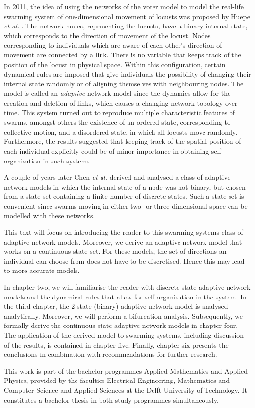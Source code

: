 In 2011, the idea of using the networks of the voter model to model the real-life swarming system of one-dimensional movement of locusts \cite{Buhl2006} was proposed by Huepe \textit{et al.} \cite{Huepe2011}. The network nodes, representing the locusts, have a binary internal state, which corresponds to the direction of movement of the locust. Nodes corresponding to individuals which are aware of each other's direction of movement are connected by a link. There is no variable that keeps track of the position of the locust in physical space. Within this configuration, certain dynamical rules are imposed that give individuals the possibility of changing their internal state randomly or of aligning themselves with neighbouring nodes. The model is called an \textit{adaptive} network model since the dynamics allow for the creation and deletion of links, which causes a changing network topology over time. This system turned out to reproduce multiple characteristic features of swarms, amongst others the existence of an ordered state, corresponding to collective motion, and a disordered state, in which all locusts move randomly. Furthermore, the results suggested that keeping track of the spatial position of each individual explicitly could be of minor importance in obtaining self-organisation in such systems.

A couple of years later Chen \textit{et al.} \cite{Chen2016} derived and analysed a class of adaptive network models in which the internal state of a node was not binary, but chosen from a state set containing a finite number of discrete states. Such a state set is convenient since swarms moving in either two- or three-dimensional space can be modelled with these networks. 

This text will focus on introducing the reader to this swarming systems class of adaptive network models. Moreover, we derive an adaptive network model that works on a continuous state set. For these models, the set of directions an individual can choose from does not have to be discretised. Hence this may lead to more accurate models.

In chapter two, we will familiarise the reader with discrete state adaptive network models and the dynamical rules that allow for self-organisation in the system. In the third chapter, the 2-state (binary) adaptive network model is analysed analytically. Moreover, we will perform a bifurcation analysis. Subsequently, we formally derive the continuous state adaptive network models in chapter four. The application of the derived model to swarming systems, including discussion of the results, is contained in chapter five. Finally, chapter six presents the conclusions in combination with recommendations for further research. 

This work is part of the bachelor programmes Applied Mathematics and Applied Physics, provided by the faculties Electrical Engineering, Mathematics and Computer Science and Applied Sciences at the Delft University of Technology. It constitutes a bachelor thesis in both study programmes simultaneously. 